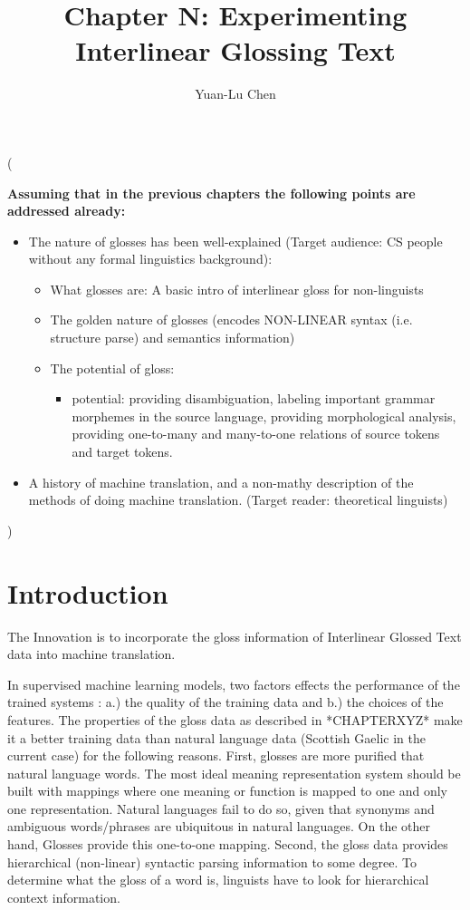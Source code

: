 \documentclass[a4paper]{article}
\title{Chapter N: Experimenting Interlinear Glossing Text}
\author{Yuan-Lu Chen}
\begin{document}


\maketitle


(

\textbf{Assuming that in the previous chapters the following points are addressed already:} 
\begin{itemize}
\item The nature of glosses has been well-explained  (Target audience: CS people without any formal linguistics background):
	\begin{itemize}
	\item What glosses are: A basic intro of interlinear gloss for non-linguists
    \item The golden nature of glosses (encodes NON-LINEAR syntax (i.e. structure parse) and semantics information) 
    \item The potential of gloss:	
		\begin{itemize}
		\item potential: providing disambiguation, labeling important grammar morphemes in the source language, providing morphological analysis, providing one-to-many and many-to-one relations of source tokens and target tokens.  
		\end{itemize}
	\end{itemize}
\item A history of machine translation, and a non-mathy description of the methods of doing machine translation. (Target reader: theoretical linguists)
\end{itemize}


)


\section{Introduction}
The Innovation is to incorporate the gloss information of Interlinear Glossed Text data into machine translation. 

In supervised machine learning models, two factors effects the performance of the trained systems \citep{kotsiantis2007supervised}: a.) the quality of the training data and b.) the choices of the features. The properties of the gloss data as described in *CHAPTERXYZ* make it a better training data than natural language data (Scottish Gaelic in the current case) for the following reasons. First, glosses are more purified that natural language words. The most ideal meaning representation system should be built with mappings where one meaning or function is mapped to one and only one representation. Natural languages fail to do so, given that synonyms and ambiguous words/phrases are ubiquitous in natural languages. On the other hand, Glosses provide this one-to-one mapping. Second, the gloss data provides hierarchical (non-linear) syntactic parsing information to some degree. To determine what the gloss of a word is, linguists have to look for hierarchical context information. 
\end{document}
